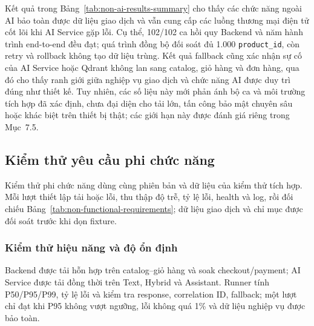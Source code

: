\endgroup

Kết quả trong Bảng~\ref{tab:non-ai-results-summary} cho thấy các chức năng ngoài
AI bảo toàn được dữ liệu giao dịch và vẫn cung cấp các luồng thương mại điện tử
cốt lõi khi AI Service gặp lỗi. Cụ thể, 102/102 ca hồi quy Backend và năm hành
trình end-to-end đều đạt; quá trình đồng bộ đối soát đủ 1.000
\texttt{product\_id}, còn retry và rollback không tạo dữ liệu trùng. Kết quả
fallback cũng xác nhận sự cố của AI Service hoặc Qdrant không lan sang catalog,
giỏ hàng và đơn hàng, qua đó cho thấy ranh giới giữa nghiệp vụ giao dịch và chức
năng AI được duy trì đúng như thiết kế. Tuy nhiên, các số liệu này mới phản ánh
bộ ca và môi trường tích hợp đã xác định, chưa đại diện cho tải lớn, tấn công bảo
mật chuyên sâu hoặc khác biệt trên thiết bị thật; các giới hạn này được đánh giá
riêng trong Mục~7.5.

\subsection{Kiểm thử yêu cầu phi chức năng}

Kiểm thử phi chức năng dùng cùng phiên bản và dữ liệu của kiểm thử tích hợp. Mỗi lượt thiết lập tải hoặc lỗi, thu thập độ trễ, tỷ lệ lỗi, health và log, rồi đối chiếu Bảng~\ref{tab:non-functional-requirements}; dữ liệu giao dịch và chỉ mục được đối soát trước khi dọn fixture.

\subsubsection{Kiểm thử hiệu năng và độ ổn định}

Backend được tải hỗn hợp trên catalog--giỏ hàng và soak checkout/payment; AI Service được tải đồng thời trên Text, Hybrid và Assistant. Runner tính P50/P95/P99, tỷ lệ lỗi và kiểm tra response, correlation ID, fallback; một lượt chỉ đạt khi P95 không vượt ngưỡng, lỗi không quá 1\% và dữ liệu nghiệp vụ được bảo toàn.

